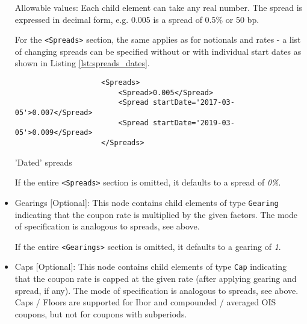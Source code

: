 \begin{itemize}
  Allowable values: Each child element can take any real number. The spread is expressed in decimal form, e.g. 0.005 is
  a spread of 0.5\% or 50 bp. 

For the {\tt <Spreads>} section, the same applies as for notionals and
rates - a list of changing spreads can be specified without or with individual start dates as shown
in Listing \ref{lst:spreads_dates}.
\begin{listing}[H]
\begin{verbatim}
                    <Spreads>
                        <Spread>0.005</Spread>
                        <Spread startDate='2017-03-05'>0.007</Spread>
                        <Spread startDate='2019-03-05'>0.009</Spread>
                    </Spreads>
\end{verbatim}
\caption{'Dated' spreads}
\label{lst:spreads_dates}
\end{listing}

If the entire {\tt <Spreads>} section is omitted, it defaults to a spread of \emph{0\%}.

\item Gearings [Optional]: This node contains child elements of type \lstinline!Gearing! indicating that the coupon rate is
  multiplied by the given factors. The mode of specification is analogous to spreads, see above.
  
If the entire {\tt <Gearings>} section is omitted, it defaults to a gearing of \emph{1}.

\item Caps [Optional]: This node contains child elements of type \lstinline!Cap! indicating that the coupon rate is
  capped at the given rate (after applying gearing and spread, if any). The mode of specification is analogous to
  spreads, see above. Caps / Floors are supported for Ibor and compounded / averaged OIS coupons, but not for coupons
  with subperiods.


\end{itemize}
